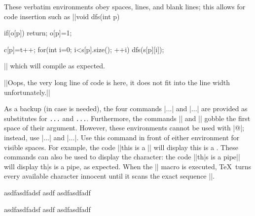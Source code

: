These verbatim environments obey spaces, lines, and blank lines; this allows for code insertion such as
||void dfs(int p){
    if(o[p]) return;
    o[p]=1;
    
    c[p]=t++;
    for(int i=0; i<s[p].size(); ++i){
        dfs(s[p][i]);
    }
}||
which will compile as expected.

||Oops, the very long line of code is here, it does not fit into the line width unfortunately.||

As a backup (in case {\tt\pipe} is needed), the four commands |\bverb...\everb| and |\bverbatim...\everbatim| are provided as substitutes for {\tt\pipe...\pipe} and {\tt\pipe\pipe...\pipe\pipe}. Furthermore, the commands |\bverb| and |\bverbs| gobble the first space of their argument. However, these environments cannot be used with |@|; instead, use |\bverbs...\everbs| and |\bverbatims...\everbatims|. Use this command in front of either environment for visible spaces. For example, the code
||\bverbs this is a \test\everbs||
will display \bverbs this is a \test\everbs.
These commands can also be used to display the {\tt\pipe} character: the code
||\bverb th|s is a pipe\everb||
will display \bverb th|s is a pipe\everb, as expected. When the |\bverb| macro is executed, \TeX\ turns every available character innocent until it scans the exact sequence |\everb|.

asdfasdfadsf
\bverbatim asdf\everbatim
asdfasdfadf

asdfasdfadsf
\bverbatim
asdf
\everbatim
asdfasdfadf

\bye
